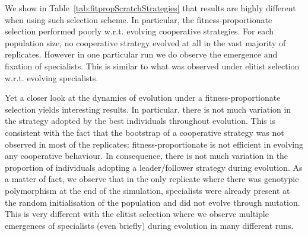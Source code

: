     \begin{table}[ht]
      \caption{\textbf{Strategies evolved by the best individuals under fitness-proportionate selection with an initially random population.} Repartition of the different strategies adopted by the best individuals at the last evaluation in each of the replicates for different population sizes. We indicate in each cell the number of simulations where a particular strategy evolved. Populations were evolved under a fitness-proportionate selection. Individuals' genotype values were initially random. In the table "L/F" stands for leader/follower and "NC" for "Non-Cooperative".}
      \label{tab:fitpropScratchStrategies}
    \end{table}

    We show in Table~\ref{tab:fitpropScratchStrategies} that results are highly different when using such selection scheme. In particular, the fitness-proportionate selection performed poorly w.r.t. evolving cooperative strategies. For each population size, no cooperative strategy evolved at all in the vast majority of replicates. However in one particular run we do observe the emergence and fixation of specialists. This is similar to what was observed under elitist selection w.r.t. evolving specialists.

    Yet a closer look at the dynamics of evolution under a fitness-proportionate selection yields interesting results. In particular, there is not much variation in the strategy adopted by the best individuals throughout evolution. This is consistent with the fact that the bootstrap of a cooperative strategy was not observed in most of the replicates: fitness-proportionate is not efficient in evolving any cooperative behaviour. In consequence, there is not much variation in the proportion of individuals adopting a leader/follower strategy during evolution. As a matter of fact, we observe that in the only replicate where there was genotypic polymorphism at the end of the simulation, specialists were already present at the random initialisation of the population and did not evolve through mutation. This is very different with the elitist selection where we observe multiple emergences of specialists (even briefly) during evolution in many different runs.

